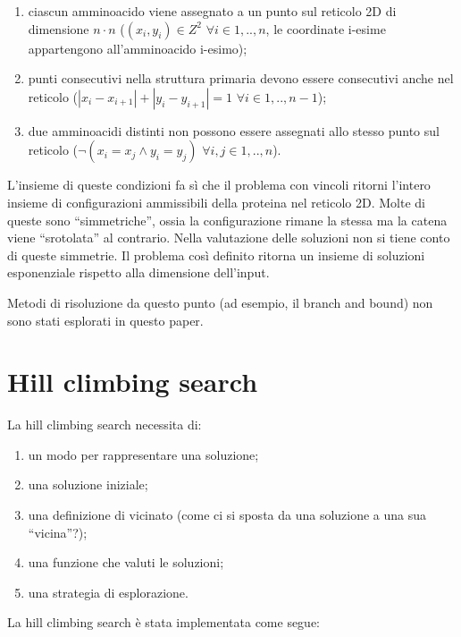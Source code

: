 \documentclass[conference]{IEEEtran}
\newcommand{\abs}[1]{\left|#1\right|}
\begin{document}
\begin{enumerate}
 \item ciascun amminoacido viene assegnato a un punto sul reticolo 2D di dimensione $n \cdot n$ ($(x_i, y_i) \in Z^2$ $\forall i \in 1,..,n$, le coordinate i-esime appartengono all'amminoacido i-esimo);
 \item punti consecutivi nella struttura primaria devono essere consecutivi anche nel reticolo ($\abs{x_i - x_{i+1}} + \abs{y_i - y_{i+1}} = 1 $ $\forall i \in 1,..,n-1$);
 \item due amminoacidi distinti non possono essere assegnati allo stesso punto sul reticolo ($ \neg (x_i = x_j \land y_i = y_j)$ $\forall i,j \in 1,..,n$).
\end{enumerate}

L'insieme di queste condizioni fa sì che il problema con vincoli ritorni l'intero insieme di configurazioni ammissibili della proteina nel reticolo 2D. Molte di queste sono ``simmetriche'', ossia la configurazione rimane la stessa ma la catena viene ``srotolata'' al contrario. Nella valutazione delle soluzioni non si tiene conto di queste simmetrie. Il problema così definito ritorna un insieme di soluzioni esponenziale rispetto alla dimensione dell'input.

Metodi di risoluzione da questo punto (ad esempio, il branch and bound) non sono stati esplorati in questo paper.

\section{Hill climbing search}

La hill climbing search necessita di:

\begin{enumerate}
 \item un modo per rappresentare una soluzione;
 \item una soluzione iniziale;
 \item una definizione di vicinato (come ci si sposta da una soluzione a una sua ``vicina''?);
 \item una funzione che valuti le soluzioni;
 \item una strategia di esplorazione.
\end{enumerate}

La hill climbing search è stata implementata come segue:
\end{document}
